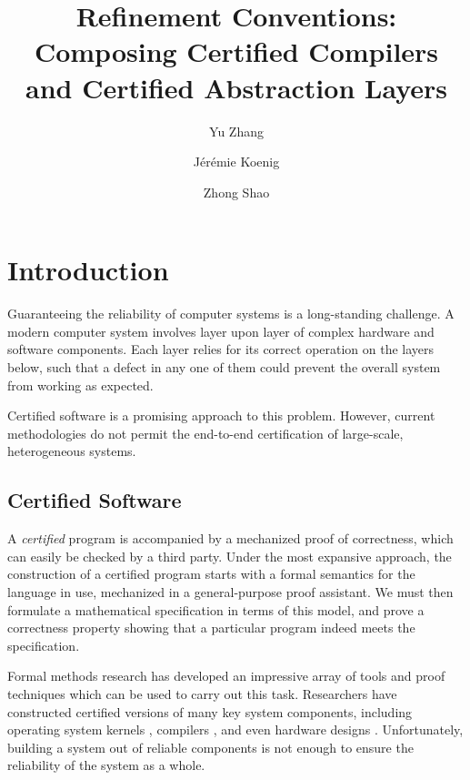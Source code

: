 \documentclass[sigplan,10pt,authordraft]{acmart}
\title{%
  Refinement Conventions:
  Composing Certified Compilers and Certified Abstraction Layers}
\author{Yu Zhang}
\affiliation{
  \institution{Yale University}
  \city{New Haven}
  \state{CT}
  \country{USA}}
\author{J\'er\'emie Koenig}
\affiliation{
  \institution{Yale University}
  \city{New Haven}
  \state{CT}
  \country{USA}}
\author{Zhong Shao}
\affiliation{
  \institution{Yale University}
  \city{New Haven}
  \state{CT}
  \country{USA}}
\begin{document}
\maketitle

\section{Introduction} %

Guaranteeing the reliability of computer systems
is a long-standing challenge.
A modern computer system involves
layer upon layer of complex hardware and software components.
Each layer relies for its correct operation
on the layers below,
such that a defect in any one of them
could prevent the overall system from
working as expected.

Certified software is a promising approach
to this problem.
However,
current methodologies do not permit
the end-to-end certification of
large-scale, heterogeneous systems.

\subsection{Certified Software}


A \emph{certified} program is accompanied by
a mechanized proof of correctness,
which can easily be checked by a third party.
Under the most expansive approach,
the construction of a certified program
starts with a formal semantics 
for the language in use,
mechanized in a general-purpose proof assistant.
We must then formulate a mathematical specification
in terms of this model,
and prove a correctness property
showing that a particular program indeed meets the specification.

Formal methods research
has developed an impressive array of
tools and proof techniques
which can be used to carry out this task.
Researchers have constructed
certified versions of many key system components,
including
operating system kernels \cite{sel4,popl15},
compilers \cite{compcert},
and even hardware designs \cite{kami}.
Unfortunately,
building a system out of reliable components
is not enough to ensure
the reliability of the system as a whole.
\end{document}
